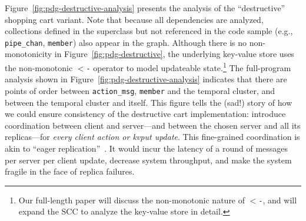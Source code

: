 Figure~\ref{fig:pdg-destructive-analysis} presents the analysis of the 
``destructive'' shopping cart variant.  Note that
because all dependencies are analyzed, collections defined in the superclass
but not referenced in the code sample
(e.g., \texttt{pipe\_chan}, \texttt{member}) also appear in the graph.
Although there is no
non-monotonicity in 
Figure~\ref{fig:pdg-destructive}, the underlying key-value store
uses the non-monotonic \texttt{$<$-} operator to model updateable
state.\footnote{Our full-length paper will discuss the non-monotonic nature of \texttt{$<$-}, and
will expand the SCC to analyze the key-value store in detail.}
The full-program analysis shown in Figure~\ref{fig:pdg-destructive-analysis}
indicates that there are
points of order between \texttt{action\_msg}, \texttt{member} and the temporal cluster,
and between the temporal cluster and itself.
This figure tells the (sad!) story of how we could ensure consistency of the destructive cart implementation: introduce coordination
between client and server---and between the chosen server and all its replicas---for {\em every client action or kvput update}.  This fine-grained coordination is akin to ``eager replication''~\cite{dangers}. It would incur the latency of a round of messages per server per client update, decrease system throughput, and make the system fragile in the face of replica failures.

